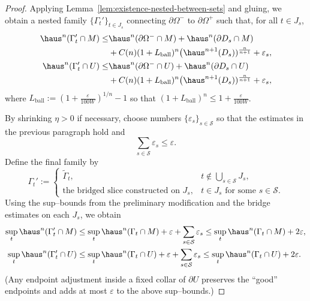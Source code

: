 \begin{lemma}
\begin{proof}
        Applying Lemma~\ref{lem:existence-nested-between-sets} and gluing, we obtain a nested family $\{\Gamma_t'\}_{t\in J_s}$ connecting $\partial\Omega^-$ to $\partial\Omega^+$ such that, for all $t\in J_s$,
        \begin{equation*}
            \begin{split}
                \haus^n(\Gamma_t'\cap M)
                \le& \haus^n(\partial\Omega^-\cap M)
                   + \haus^n(\partial D_s\cap M)\\
                   &+ C(n)(1+L_{\mathrm{ball}})^n\big(\haus^{n+1}(D_s))^{\frac{n}{n+1}}
                   + \varepsilon_s,\\
                \haus^n(\Gamma_t'\cap U)
                \le& \haus^n(\partial\Omega^-\cap U)
                   + \haus^n(\partial D_s\cap U)\\
                   &+ C(n)(1+L_{\mathrm{ball}})^n\big(\haus^{n+1}(D_s))^{\frac{n}{n+1}}
                   + \varepsilon_s,
            \end{split}
        \end{equation*}
        where $L_{\mathrm{ball}}:=(1+\frac{\varepsilon}{100W})^{1/n}-1$ so that $(1+L_{\mathrm{ball}})^n\le 1+\frac{\varepsilon}{100W}$.    
        
        By shrinking $\eta>0$ if necessary, choose numbers $\{\varepsilon_s\}_{s\in\mathcal S}$ so that the estimates in the previous paragraph hold and
        \begin{equation*}
          \sum_{s\in\mathcal S}\varepsilon_s \le \varepsilon.
        \end{equation*}
        Define the final family by
        \begin{equation*}
          \Gamma_t' :=
          \begin{cases}
            \widetilde{\Gamma}_t, & t\notin \displaystyle\bigcup_{s\in\mathcal S} J_s,\\[2pt]
            \text{the bridged slice constructed on }J_s, & t\in J_s \text{ for some } s\in\mathcal S.
          \end{cases}
        \end{equation*}
        Using the sup–bounds from the preliminary modification and the bridge estimates on each $J_s$, we obtain
        \begin{equation*}
            \begin{split}
                \sup_t \haus^n(\Gamma_t'\cap M)
                &\le \sup_t \haus^n(\Gamma_t\cap M) + \varepsilon + \sum_{s\in\mathcal S}\varepsilon_s \le \sup_t \haus^n(\Gamma_t\cap M)+2\varepsilon,\\
                \sup_t \haus^n(\Gamma_t'\cap U)
                &\le \sup_t \haus^n(\Gamma_t\cap U)+\varepsilon+\sum_{s\in\mathcal{S}}\varepsilon_s \le \sup_t \haus^n(\Gamma_t\cap U)+2\varepsilon.
            \end{split}
        \end{equation*}
        (Any endpoint adjustment inside a fixed collar of $\partial U$ preserves the “good” endpoints and adds at most $\varepsilon$ to the above sup–bounds.)
    \end{proof}
\end{lemma}
